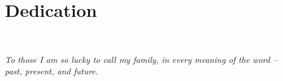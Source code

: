 \documentclass[12pt]{report}
\newcommand{\add}[1]{\textcolor{red}{\textbf{[ADD:} #1\textbf{]}}}
\newcommand{\question}[1]{\textcolor{purple}{\textbf{Q:} #1\textbf{}}}
\newcommand{\SC}[1]{\textcolor{sc}{\textbf{SC:} #1\textbf{}}}
\newcommand{\note}[1]{\textcolor{teal}{\textit{[NOTE: #1]}}}
\newcommand{\status}[1]{\textcolor{magenta}{(\textbf{Status:} \textit{#1})}}
\newcommand{\quoted}[1]{\textcolor{violet}{\textit{``#1''}}}
\newcommand{\permission}[1]{\textcolor{gray}{\emph{[#1]}} }
\newcommand{\code}[1]{\textcolor{orange}{\emph{[#1]}} }
\newcommand{\coded}[1]{\textcolor{olive}{\emph{[#1]}} }
\newcommand{\sudo}[1]{\textcolor{violet}{\emph{[Note: #1]}} }
\newcommand{\later}[1]{\textcolor{brown}{\emph{[Note: #1]}} }
\begin{document}
{}







\chapter*{Dedication}\
{
\centering
\emph{To those I am so lucky to call my family, in every meaning of the word --\\
past, present, and future.}
\par
}





















\end{document}
